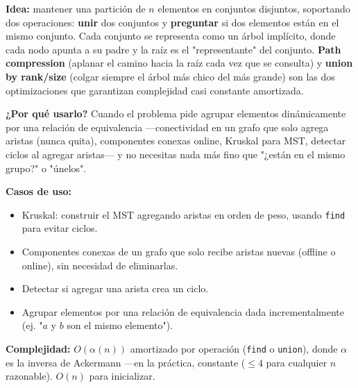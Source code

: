 \documentclass[10pt,a4paper,twocolumn]{article}
\begin{document}
\textbf{Idea:} mantener una partición de $n$ elementos en conjuntos
disjuntos, soportando dos operaciones: \textbf{unir} dos conjuntos y
\textbf{preguntar} si dos elementos están en el mismo conjunto. Cada
conjunto se representa como un árbol implícito, donde cada nodo
apunta a su padre y la raíz es el "representante" del conjunto.
\textbf{Path compression} (aplanar el camino hacia la raíz cada vez
que se consulta) y \textbf{union by rank/size} (colgar siempre el
árbol más chico del más grande) son las dos optimizaciones que
garantizan complejidad casi constante amortizada.

\textbf{¿Por qué usarlo?} Cuando el problema pide agrupar elementos
dinámicamente por una relación de equivalencia —conectividad en un
grafo que solo agrega aristas (nunca quita), componentes conexas
online, Kruskal para MST, detectar ciclos al agregar aristas— y no
necesitas nada más fino que "¿están en el mismo grupo?" o "únelos".

\textbf{Casos de uso:}

\begin{itemize}
    \item Kruskal: construir el MST agregando aristas en orden de
    peso, usando \texttt{find} para evitar ciclos.
    \item Componentes conexas de un grafo que solo recibe aristas
    nuevas (offline o online), sin necesidad de eliminarlas.
    \item Detectar si agregar una arista crea un ciclo.
    \item Agrupar elementos por una relación de equivalencia dada
    incrementalmente (ej. "$a$ y $b$ son el mismo elemento").
\end{itemize}

\textbf{Complejidad:} $O(\alpha(n))$ amortizado por operación
(\texttt{find} o \texttt{union}), donde $\alpha$ es la inversa de
Ackermann —en la práctica, constante ($\le 4$ para cualquier $n$
razonable). $O(n)$ para inicializar.
\end{document}
